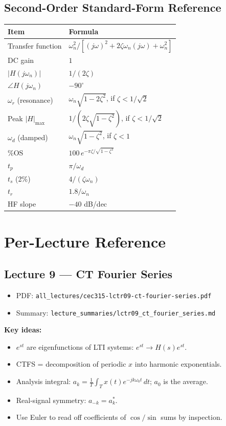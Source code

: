 \documentclass[11pt]{article}
\begin{document}
\subsection{Second-Order Standard-Form Reference}
\begin{center}
\begin{tabular}{|l|l|}
\hline
Item & Formula\\
\hline
Transfer function & $\omega_n^2 / [(j\omega)^2 + 2\zeta\omega_n(j\omega) + \omega_n^2]$\\
DC gain & $1$\\
$|H(j\omega_n)|$ & $1/(2\zeta)$\\
$\angle H(j\omega_n)$ & $-90^\circ$\\
$\omega_r$ (resonance) & $\omega_n\sqrt{1-2\zeta^2}$, if $\zeta<1/\sqrt{2}$\\
Peak $|H|_\mathrm{max}$ & $1/(2\zeta\sqrt{1-\zeta^2})$, if $\zeta<1/\sqrt{2}$\\
$\omega_d$ (damped) & $\omega_n\sqrt{1-\zeta^2}$, if $\zeta<1$\\
\%OS & $100\, e^{-\pi\zeta/\sqrt{1-\zeta^2}}$\\
$t_p$ & $\pi/\omega_d$\\
$t_s$ (2\%) & $4/(\zeta\omega_n)$\\
$t_r$ & $1.8/\omega_n$\\
HF slope & $-40$ dB/dec\\
\hline
\end{tabular}
\end{center}

\section{Per-Lecture Reference}

\subsection{Lecture 9 --- CT Fourier Series}
\begin{itemize}[leftmargin=*]
  \item PDF: \texttt{all\_lectures/cec315-lctr09-ct-fourier-series.pdf}
  \item Summary: \texttt{lecture\_summaries/lctr09\_ct\_fourier\_series.md}
\end{itemize}
\textbf{Key ideas:}
\begin{itemize}[leftmargin=*]
  \item $e^{st}$ are eigenfunctions of LTI systems: $e^{st} \to H(s)e^{st}$.
  \item CTFS = decomposition of periodic $x$ into harmonic exponentials.
  \item Analysis integral: $a_k = \frac{1}{T}\int_T x(t)e^{-jk\omega_0 t}\,dt$; $a_0$ is the average.
  \item Real-signal symmetry: $a_{-k} = a_k^*$.
  \item Use Euler to read off coefficients of $\cos/\sin$ sums by inspection.
\end{itemize}
\end{document}
